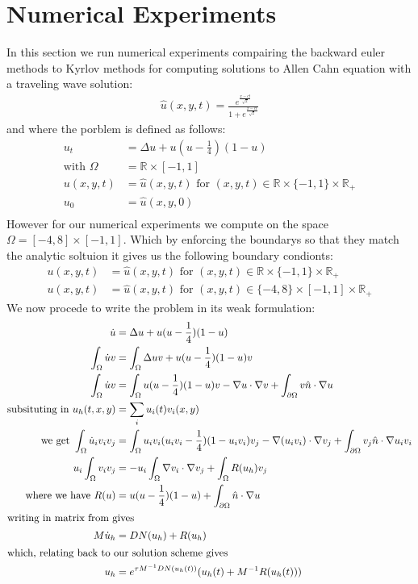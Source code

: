 \section{Numerical Experiments}

In this section we run numerical experiments compairing the backward euler methods to Kyrlov methods for computing solutions to Allen Cahn equation with a traveling wave solution\cite{YukitakaFukao2004}:
\begin{align}
    \hat u(x,y,t)=\frac{e^{\frac{x-ct}{\sqrt2}}}{1+e^{\frac{x-ct}{\sqrt2}}} \label{TravelingWaveSol}
\end{align}
and where the porblem is defined as follows:
\begin{align*}
    u_t&=\Delta u+u(u-\frac14)(1-u)\\
    \text{with } \Omega &= \mathbb{R}\times[-1,1]\\
    u(x,y,t) &= \hat u(x,y,t) \text{ for $(x,y,t) \in \mathbb{R}\times\{-1,1\}\times\mathbb{R}_+$}\\
    u_0 &= \hat u(x,y,0)\\
\end{align*}
However for our numerical experiments we compute on the space $\Omega=[-4,8]\times[-1,1]$.
Which by enforcing the boundarys so that they match the analytic soltuion it gives us the following boundary condionts:
\begin{align*}
    u(x,y,t) &= \hat u(x,y,t) \text{ for $(x,y,t) \in \mathbb{R}\times\{-1,1\}\times\mathbb{R}_+$}\\
    u(x,y,t) &= \hat u(x,y,t) \text{ for $(x,y,t) \in \{-4,8\}\times[-1,1]\times\mathbb{R}_+$}
\end{align*}
We now procede to write the problem in its weak formulation:
\begin{align*}
    \dot u&=\Delta u+u(u-\frac14)(1-u)\\
    \int_{\Omega} \dot u v &=\int_{\Omega} \Delta uv+u(u-\frac14)(1-u)v\\
    \int_{\Omega} \dot u v &=\int_{\Omega} u(u-\frac14)(1-u)v - \nabla u \cdot \nabla v + \int_{\partial\Omega}  v\hat n \cdot \nabla u\\
    \text{subsituting in } u_h(t,x,y) &= \sum_i u_i(t) v_i(x,y)\\
    \text{we get } \int_{\Omega} \dot u_i v_i v_j &=\int_{\Omega} u_iv_i(u_iv_i-\frac14)(1-u_iv_i)v_j - \nabla (u_iv_i) \cdot \nabla v_j + \int_{\partial\Omega}  v_j\hat n \cdot \nabla u_iv_i\\
    u_i\int_{\Omega}v_iv_j &= -u_i\int_{\Omega}\nabla v_i \cdot \nabla v_j + \int_{\Omega}R(u_h)v_j\\
    \text{where we have } R(u)&=u(u-\frac14)(1-u) + \int_{\partial\Omega}  \hat n \cdot \nabla u\\
    \intertext{writing in matrix from gives}
    M\dot u_h &= DN(u_h) + R(u_h)\\
    \intertext{which, relating back to our solution scheme gives}
    u_h &= e^{\tau M^{-1}DN(u_h(t))}(u_h(t) + M^{-1}R(u_h(t)))
\end{align*}

